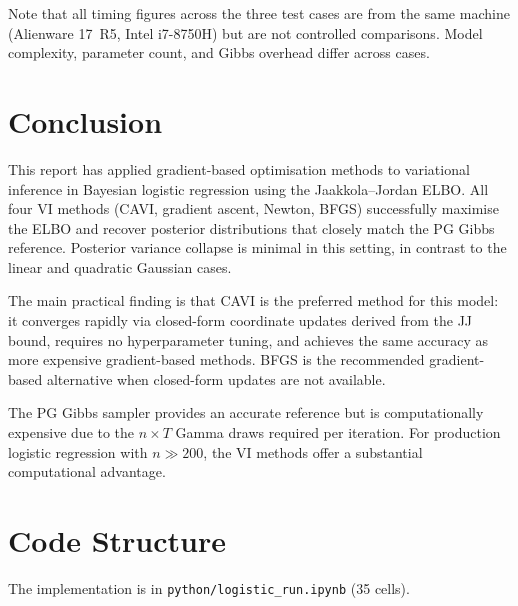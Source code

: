 \documentclass[11pt,a4paper]{article}
\begin{document}
Note that all timing figures across the three test cases are from the same machine
(Alienware 17~R5, Intel i7-8750H) but are not controlled comparisons.
Model complexity, parameter count, and Gibbs overhead differ across cases.

\section*{Conclusion}

This report has applied gradient-based optimisation methods to variational inference
in Bayesian logistic regression using the Jaakkola--Jordan ELBO.
All four VI methods (CAVI, gradient ascent, Newton, BFGS) successfully maximise the ELBO
and recover posterior distributions that closely match the PG Gibbs reference.
Posterior variance collapse is minimal in this setting, in contrast to the linear and
quadratic Gaussian cases.

The main practical finding is that CAVI is the preferred method for this model:
it converges rapidly via closed-form coordinate updates derived from the JJ bound,
requires no hyperparameter tuning, and achieves the same accuracy as more
expensive gradient-based methods.
BFGS is the recommended gradient-based alternative when closed-form updates are
not available.

The PG Gibbs sampler provides an accurate reference but is computationally expensive
due to the $n \times T$ Gamma draws required per iteration.
For production logistic regression with $n \gg 200$, the VI methods offer a substantial
computational advantage.

\printbibliography

\appendix
\section{Code Structure}
\label{app:code}

The implementation is in \texttt{python/logistic\_run.ipynb} (35 cells).
\end{document}
